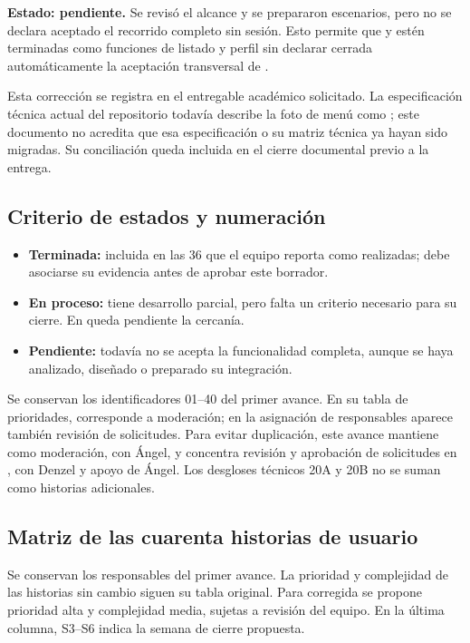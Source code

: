 \textbf{Estado: pendiente.} Se revisó el alcance y se prepararon escenarios,
pero no se declara aceptado el recorrido completo sin sesión. Esto permite
que  y  estén terminadas como funciones de listado y perfil
sin declarar cerrada automáticamente la aceptación transversal de .

Esta corrección se registra en el entregable académico solicitado. La
especificación técnica actual del repositorio todavía describe la foto de
menú como ; este documento no acredita que esa especificación o su
matriz técnica ya hayan sido migradas. Su conciliación queda incluida en el
cierre documental previo a la entrega.

\subsection{Criterio de estados y numeración}
\begin{itemize}
\item \textbf{Terminada:} incluida en las 36 que el equipo reporta como
realizadas; debe asociarse su evidencia antes de aprobar este borrador.
\item \textbf{En proceso:} tiene desarrollo parcial, pero falta un criterio
necesario para su cierre. En  queda pendiente la cercanía.
\item \textbf{Pendiente:} todavía no se acepta la funcionalidad completa,
aunque se haya analizado, diseñado o preparado su integración.
\end{itemize}

Se conservan los identificadores 01--40 del primer avance. En su tabla de
prioridades,  corresponde a moderación; en la asignación de responsables
aparece también revisión de solicitudes. Para evitar duplicación, este avance
mantiene  como moderación, con Ángel, y concentra revisión y aprobación
de solicitudes en , con Denzel y apoyo de Ángel. Los desgloses técnicos
20A y 20B no se suman como historias adicionales.

\clearpage
\subsection{Matriz de las cuarenta historias de usuario}
Se conservan los responsables del primer avance. La prioridad y complejidad
de las historias sin cambio siguen su tabla original. Para  corregida
se propone prioridad alta y complejidad media, sujetas a revisión del equipo.
En la última columna, S3--S6 indica la semana de cierre propuesta.

